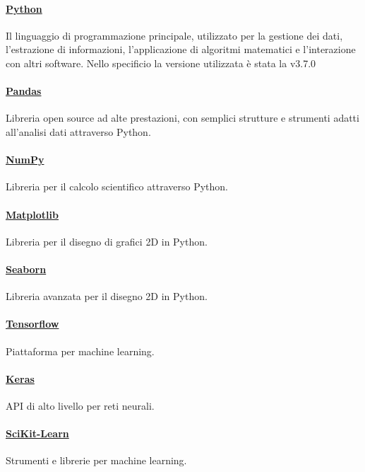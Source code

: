\documentclass[%
    corpo=12pt,
    twoside,
    oldstyle,
    autoretitolo,
    greek,
    evenboxes,
]{toptesi}
\begin{document}
\paragraph{\href{https://www.python.org/}{Python}} Il linguaggio di programmazione principale, utilizzato per la gestione dei dati, l'estrazione di informazioni, l'applicazione di algoritmi matematici e l'interazione con altri software. Nello specificio la versione utilizzata è stata la v3.7.0

\paragraph{\href{https://pandas.pydata.org/}{Pandas}} Libreria open source ad alte prestazioni, con semplici strutture e strumenti adatti all'analisi dati attraverso Python.

\paragraph{\href{https://numpy.org/}{NumPy}} Libreria per il calcolo scientifico attraverso Python.

\paragraph{\href{https://matplotlib.org/}{Matplotlib}} Libreria per il disegno di grafici 2D in Python.

\paragraph{\href{https://seaborn.pydata.org/}{Seaborn}} Libreria avanzata per il disegno 2D in Python.

\paragraph{\href{https://www.tensorflow.org/}{Tensorflow}} Piattaforma per machine learning.

\paragraph{\href{https://keras.io/}{Keras}} API di alto livello per reti neurali.

\paragraph{\href{https://scikit-learn.org/stable/}{SciKit-Learn}} Strumenti e librerie per machine learning.
\end{document}
